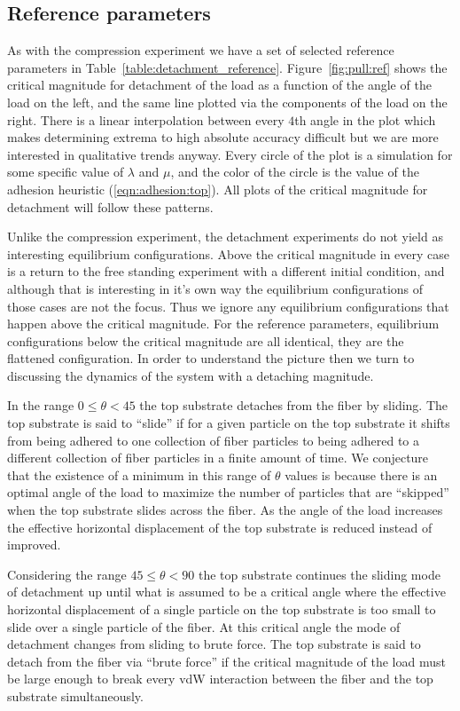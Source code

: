 \subsection{Reference parameters}

As with the compression experiment we have a set of selected reference parameters in Table~\ref{table:detachment_reference}. Figure~\ref{fig:pull:ref} shows the critical magnitude for detachment of the load as a function of the angle of the load on the left, and the same line plotted via the components of the load on the right. There is a linear interpolation between every $4$th angle in the plot which makes determining extrema to high absolute accuracy difficult but we are more interested in qualitative trends anyway. Every circle of the plot is a simulation for some specific value of $\lambda$ and $\mu$, and the color of the circle is the value of the adhesion heuristic (\ref{eqn:adhesion:top}). All plots of the critical magnitude for detachment will follow these patterns.

Unlike the compression experiment, the detachment experiments do not yield as interesting equilibrium configurations. Above the critical magnitude in every case is a return to the free standing experiment with a different initial condition, and although that is interesting in it's own way the equilibrium configurations of those cases are not the focus. Thus we ignore any equilibrium configurations that happen above the critical magnitude. For the reference parameters, equilibrium configurations below the critical magnitude are all identical, they are the flattened configuration. In order to understand the picture then we turn to discussing the dynamics of the system with a detaching magnitude.

In the range $0 \leq \theta < 45$ the top substrate detaches from the fiber by sliding. The top substrate is said to ``slide'' if for a given particle on the top substrate it shifts from being adhered to one collection of fiber particles to being adhered to a different collection of fiber particles in a finite amount of time. We conjecture that the existence of a minimum in this range of $\theta$ values is because there is an optimal angle of the load to maximize the number of particles that are ``skipped'' when the top substrate slides across the fiber. As the angle of the load increases the effective horizontal displacement of the top substrate is reduced instead of improved.

Considering the range $45 \leq \theta < 90$ the top substrate continues the sliding mode of detachment up until what is assumed to be a critical angle where the effective horizontal displacement of a single particle on the top substrate is too small to slide over a single particle of the fiber. At this critical angle the mode of detachment changes from sliding to brute force. The top substrate is said to detach from the fiber via ``brute force'' if the critical magnitude of the load must be large enough to break every vdW interaction between the fiber and the top substrate simultaneously.


